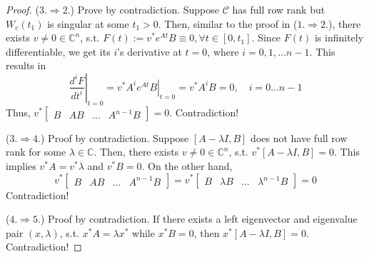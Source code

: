 \documentclass[
]{book}
\theoremstyle{definition}
\theoremstyle{definition}
\theoremstyle{definition}
\theoremstyle{definition}
\theoremstyle{remark}
\begin{document}
\begin{proof}
(\(3. \Rightarrow 2.\)) Prove by contradiction. Suppose \(\mathcal{C}\) has full row rank but \(W_c(t_1)\) is singular at some \(t_1 > 0\). Then, similar to the proof in (\(1. \Rightarrow 2.\)), there exists \(v \ne 0 \in \mathbb{C}^n\), s.t. \(F(t) := v^* e^{At} B \equiv 0, \forall t \in [0, t_1]\). Since \(F(t)\) is infinitely differentiable, we get its \(i\)'s derivative at \(t=0\), where \(i = 0, 1, \dots n-1\). This results in
\begin{equation*}
   \left. \frac{d^i F}{dt^i} \right|_{t=0} = \left. v^* A^{i} e^{At} B \right|_{t=0} = v^* A^i B = 0, \quad i = 0 \dots n-1
\end{equation*}
Thus, \(v^* \begin{bmatrix}
   B & AB & \dots & A^{n-1} B
\end{bmatrix} = 0\). Contradiction!

(\(3. \Rightarrow 4.\)) Proof by contradiction. Suppose \([A - \lambda I, B]\) does not have full row rank for some \(\lambda \in \mathbb{C}\). Then, there exists \(v \ne 0 \in \mathbb{C}^n\), s.t. \(v^* [A - \lambda I, B] = 0\). This implies \(v^* A = v^* \lambda\) and \(v^* B = 0\). On the other hand,
\begin{equation*}
   v^* \begin{bmatrix}
      B & AB & \dots & A^{n-1}B
   \end{bmatrix} = v^* \begin{bmatrix}
      B & \lambda B & \dots & \lambda^{n-1} B
   \end{bmatrix} = 0
\end{equation*}
Contradiction!

(\(4. \Rightarrow 5.\)) Proof by contradiction. If there exists a left eigenvector and eigenvalue pair \((x, \lambda)\), s.t. \(x^* A = \lambda x^*\) while \(x^*B = 0\), then \(x^* [A - \lambda I, B] = 0\). Contradiction!


\end{proof}
\end{document}
